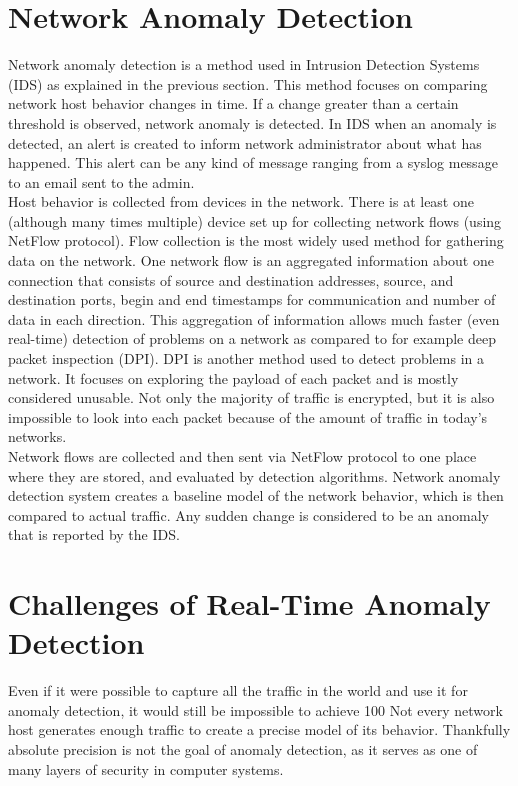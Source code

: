 \documentclass[thesis=B,english]{FITthesis}[2012/10/20]
\begin{document}
\section{Network Anomaly Detection}
Network anomaly detection is a method used in Intrusion Detection Systems (IDS) as explained in the previous section.
This method focuses on comparing network host behavior changes in time.
If a change greater than a certain threshold is observed, network anomaly is detected.
In IDS when an anomaly is detected, an alert is created to inform network administrator about what has happened.
This alert can be any kind of message ranging from a syslog message to an email sent to the admin. \\

Host behavior is collected from devices in the network.
There is at least one (although many times multiple) device set up for collecting network flows (using NetFlow protocol).
Flow collection is the most widely used method for gathering data on the network.
One network flow is an aggregated information about one connection that consists of source and destination addresses, source, and destination ports, begin and end timestamps for communication and number of data in each direction.
This aggregation of information allows much faster (even real-time) detection of problems on a network as compared to for example deep packet inspection (DPI).
DPI is another method used to detect problems in a network.
It focuses on exploring the payload of each packet and is mostly considered unusable.
Not only the majority of traffic is encrypted, but it is also impossible to look into each packet because of the amount of traffic in today's networks. \\

Network flows are collected and then sent via NetFlow protocol to one place where they are stored, and evaluated by detection algorithms.
Network anomaly detection system creates a baseline model of the network behavior, which is then compared to actual traffic.
Any sudden change is considered to be an anomaly that is reported by the IDS. \\

\section{Challenges of Real-Time Anomaly Detection}
Even if it were possible to capture all the traffic in the world and use it for anomaly detection, it would still be impossible to achieve 100%
Not every network host generates enough traffic to create a precise model of its behavior.
Thankfully absolute precision is not the goal of anomaly detection, as it serves as one of many layers of security in computer systems. \\
\end{document}
